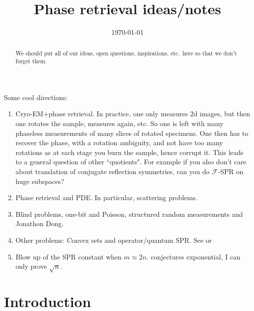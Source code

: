\documentclass[12pt,leqno]{amsart}
\title[Phase retrieval ideas/notes]{Phase retrieval ideas/notes}
\date{\today}
\numberwithin{equation}{section}
\theoremstyle{plain}
\theoremstyle{definition}
\begin{document}
\begin{abstract}
   We should put all of our ideas, open questions, inspirations, etc.~here so that we don't forget them.
\end{abstract}

\maketitle
\allowdisplaybreaks



Some cool directions: 
\begin{enumerate}
\item Cryo-EM+phase retrieval. In practice, one only measures 2d images, but then one rotates the sample, measures again, etc. So one is left with many phaseless measurements of many slices of rotated specimens. One then has to recover the phase, with a rotation ambiguity, and not have too many rotations as at each stage you burn the sample, hence corrupt it. This leads to a general question of other ``quotients". For example if you also don't care about translation of conjugate reflection symmetries, can you do $\mathcal{F}$-SPR on huge subspaces?
\item Phase retrieval and PDE. In particular, scattering problems.
\item Blind problems, one-bit and Poisson, structured random measurements and Jonathon Dong.
\item Other problems: Convex sets and operator/quantum SPR.  See \cite{MR3959732} or \cite{balan2021lipschitz}
\item Blow up of the SPR constant when $m\approx 2n$. \cite{MR3323113} conjectures exponential, I can only prove $\sqrt{n}$. 
\end{enumerate}
\setlength\parindent{0pt}
\section{Introduction}
\end{document}
